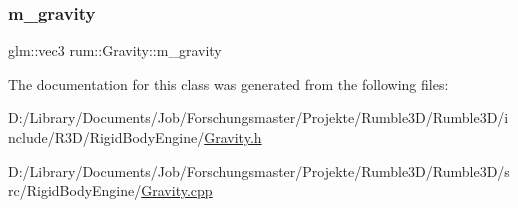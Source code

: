\subsubsection{\texorpdfstring{m\+\_\+gravity}{m\_gravity}}
{\footnotesize\ttfamily glm\+::vec3 rum\+::\+Gravity\+::m\+\_\+gravity\hspace{0.3cm}{\ttfamily [protected]}}



The documentation for this class was generated from the following files\+:\begin{DoxyCompactItemize}
\item 
D\+:/\+Library/\+Documents/\+Job/\+Forschungsmaster/\+Projekte/\+Rumble3\+D/\+Rumble3\+D/include/\+R3\+D/\+Rigid\+Body\+Engine/\mbox{\hyperlink{_gravity_8h}{Gravity.\+h}}\item 
D\+:/\+Library/\+Documents/\+Job/\+Forschungsmaster/\+Projekte/\+Rumble3\+D/\+Rumble3\+D/src/\+Rigid\+Body\+Engine/\mbox{\hyperlink{_gravity_8cpp}{Gravity.\+cpp}}\end{DoxyCompactItemize}
